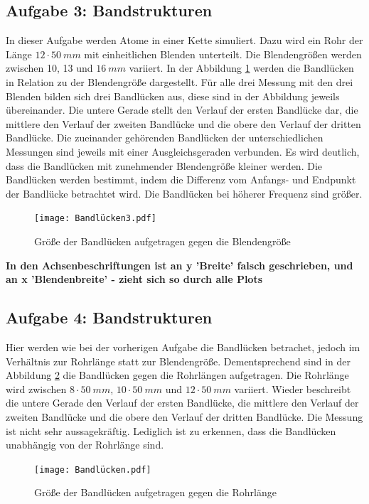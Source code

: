 \subsection{Aufgabe 3: Bandstrukturen}
\FloatBarrier
In dieser Aufgabe werden Atome in einer Kette simuliert.
Dazu wird ein Rohr der Länge $12 \cdot \SI{50}{mm}$ mit einheitlichen Blenden unterteilt.
Die Blendengrößen werden zwischen 10, 13 und $\SI{16}{mm}$ variiert.
In der Abbildung \ref{fig.Aufgabe3} werden die Bandlücken in Relation zu der Blendengröße dargestellt.
Für alle drei Messung mit den drei Blenden bilden sich drei Bandlücken aus, diese sind in der Abbildung jeweils übereinander.
Die untere Gerade stellt den Verlauf der ersten Bandlücke dar, die mittlere den Verlauf der zweiten Bandlücke und die obere den Verlauf der dritten Bandlücke.
Die zueinander gehörenden Bandlücken der unterschiedlichen Messungen sind jeweils mit einer Ausgleichsgeraden verbunden.
Es wird deutlich, dass die Bandlücken mit zunehmender Blendengröße kleiner werden.
Die Bandlücken werden bestimmt, indem die Differenz vom Anfangs- und Endpunkt der Bandlücke betrachtet wird.
Die Bandlücken bei höherer Frequenz sind größer.
\begin{figure}[h!]
  \centering
  \texttt{[image: Bandlücken3.pdf]}
  \caption{Größe der Bandlücken aufgetragen gegen die Blendengröße}
  \label{fig.Aufgabe3}
\end{figure}
\textbf{\huge{In den Achsenbeschriftungen ist an y 'Breite' falsch geschrieben, und an x 'Blendenbreite' - zieht sich so durch alle Plots}}
\FloatBarrier

\subsection{Aufgabe 4: Bandstrukturen}
Hier werden wie bei der vorherigen Aufgabe die Bandlücken betrachet, jedoch im Verhältnis zur Rohrlänge statt zur Blendengröße.
Dementsprechend sind in der Abbildung \ref{fig.Aufgabe4} die Bandlücken gegen die Rohrlängen aufgetragen.
Die Rohrlänge wird zwischen $8 \cdot \SI{50}{mm}$, $10 \cdot \SI{50}{mm}$ und $12 \cdot \SI{50}{mm}$ variiert.
Wieder beschreibt die untere Gerade den Verlauf der ersten Bandlücke, die mittlere den Verlauf der zweiten Bandlücke und die obere den Verlauf der dritten Bandlücke.
Die Messung ist nicht sehr aussagekräftig.
Lediglich ist zu erkennen, dass die Bandlücken unabhängig von der Rohrlänge sind.
\begin{figure}[h!]
  \centering
  \texttt{[image: Bandlücken.pdf]}
  \caption{Größe der Bandlücken aufgetragen gegen die Rohrlänge}
  \label{fig.Aufgabe4}
\end{figure}
\FloatBarrier

